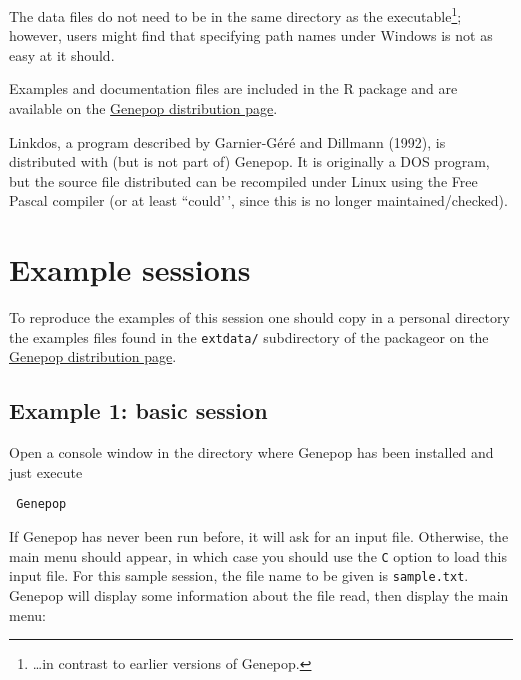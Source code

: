 \documentclass[
  12pt,
]{book}
\begin{document}
The data files do not need to be in the same directory as the executable\footnote{\ldots in contrast to earlier versions of Genepop.}; however, users might find that specifying path names under Windows is not as easy at it should.

Examples and documentation files are included in the R package and are available on the \href{https://kimura.univ-montp2.fr/~rousset/Genepop.htm}{Genepop distribution page}.

Linkdos, a program described by Garnier-Géré and Dillmann (1992), is distributed with (but is not part of) Genepop. It is originally a DOS program, but the source file distributed can be recompiled under Linux using the Free Pascal compiler (or at least ``could'\,', since this is no longer maintained/checked).

\hypertarget{example-sessions}{%
\section{Example sessions}\label{example-sessions}}

To reproduce the examples of this session one should copy in a personal directory the examples files found in the \texttt{extdata/} subdirectory of the packageor on the \href{https://kimura.univ-montp2.fr/~rousset/Genepop.htm}{Genepop distribution page}.

\hypertarget{example-1-basic-session}{%
\subsection{Example 1: basic session}\label{example-1-basic-session}}

Open a console window in the directory where Genepop has
been installed and just execute

\begin{verbatim}
 Genepop
\end{verbatim}

If Genepop has never been run before, it will ask for an input file. Otherwise, the main menu should appear, in which case you should use the \texttt{C} option to load this input file. For this sample session, the file name to be given is \texttt{sample.txt}. Genepop will display some information about the file read, then display the main menu:
\end{document}
